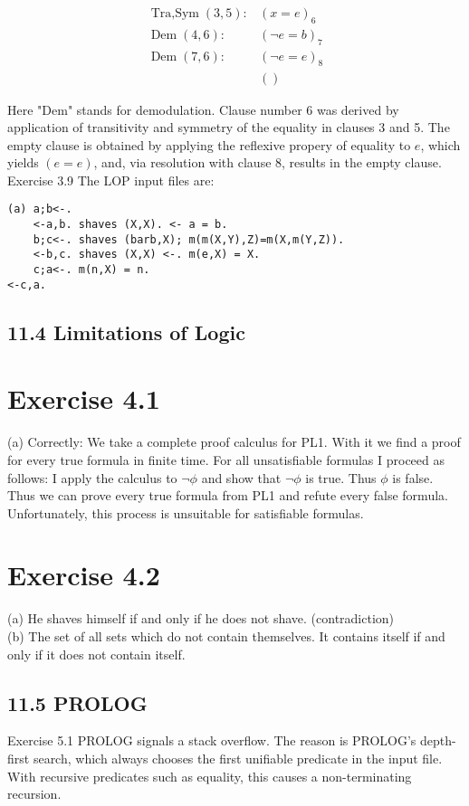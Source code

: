 \documentclass[10pt]{article}
\begin{document}
$$
\begin{array}{ll}
\operatorname{Tra,Sym}(3,5): & (x=e)_{6} \\
\operatorname{Dem}(4,6): & (\neg e=b)_{7} \\
\operatorname{Dem}(7,6): & (\neg e=e)_{8} \\
& ()
\end{array}
$$

Here "Dem" stands for demodulation. Clause number 6 was derived by application of transitivity and symmetry of the equality in clauses 3 and 5. The empty clause is obtained by applying the reflexive propery of equality to $e$, which yields $(e=e)$, and, via resolution with clause 8, results in the empty clause.\\
Exercise 3.9 The LOP input files are:

\begin{verbatim}
(a) a;b<-.
    <-a,b. shaves (X,X). <- a = b.
    b;c<-. shaves (barb,X); m(m(X,Y),Z)=m(X,m(Y,Z)).
    <-b,c. shaves (X,X) <-. m(e,X) = X.
    c;a<-. m(n,X) = n.
<-c,a.
\end{verbatim}

\subsection*{11.4 Limitations of Logic}
\section*{Exercise 4.1}
(a) Correctly: We take a complete proof calculus for PL1. With it we find a proof for every true formula in finite time. For all unsatisfiable formulas I proceed as follows: I apply the calculus to $\neg \phi$ and show that $\neg \phi$ is true. Thus $\phi$ is false. Thus we can prove every true formula from PL1 and refute every false formula. Unfortunately, this process is unsuitable for satisfiable formulas.

\section*{Exercise 4.2}
(a) He shaves himself if and only if he does not shave. (contradiction)\\
(b) The set of all sets which do not contain themselves. It contains itself if and only if it does not contain itself.

\subsection*{11.5 PROLOG}
Exercise 5.1 PROLOG signals a stack overflow. The reason is PROLOG's depth-first search, which always chooses the first unifiable predicate in the input file. With recursive predicates such as equality, this causes a non-terminating recursion.
\end{document}
